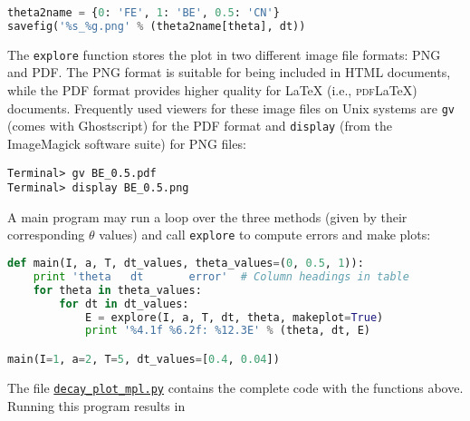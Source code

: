 \documentclass[graybox,sectrefs,envcountresetchap,open=right,final]{svmonodo}
\begin{document}
\begin{lstlisting}[language=python,style=blue1_bluegreen]
theta2name = {0: 'FE', 1: 'BE', 0.5: 'CN'}
savefig('%s_%g.png' % (theta2name[theta], dt))

\end{lstlisting}


  

The \texttt{explore} function stores the plot in two different image file formats:
PNG and PDF. The PNG format is suitable for
being included in HTML documents, while the PDF format provides
higher quality for {\LaTeX} (i.e., \textsc{pdf}{\LaTeX}) documents.
Frequently used viewers for these
image files on Unix systems are \texttt{gv} (comes with Ghostscript)
for the PDF format and
\texttt{display} (from the ImageMagick software suite) for PNG files:




\begin{Verbatim}[frame=lines,label=\fbox{{\tiny Terminal}},framesep=2.5mm,framerule=0.7pt,fontsize=\fontsize{9pt}{9pt}]
Terminal> gv BE_0.5.pdf
Terminal> display BE_0.5.png

\end{Verbatim}


A main program may run a loop over the three methods (given by
their corresponding $\theta$ values)
and call \texttt{explore} to compute errors and make plots:










\begin{lstlisting}[language=python,style=blue1_bluegreen]
def main(I, a, T, dt_values, theta_values=(0, 0.5, 1)):
    print 'theta   dt       error'  # Column headings in table
    for theta in theta_values:
        for dt in dt_values:
            E = explore(I, a, T, dt, theta, makeplot=True)
            print '%4.1f %6.2f: %12.3E' % (theta, dt, E)

main(I=1, a=2, T=5, dt_values=[0.4, 0.04])

\end{lstlisting}

The file \href{{http://tinyurl.com/ofkw6kc/alg/decay_plot_mpl.py}}{\nolinkurl{decay_plot_mpl.py}}
contains the complete code with the functions above.
Running this program results in
\end{document}
